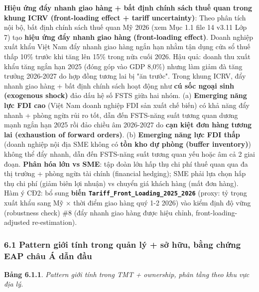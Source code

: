 \documentclass[12pt,a4paper]{article}
\begin{document}
\textbf{Hiệu ứng đẩy nhanh giao hàng + bất định chính sách thuế quan
trong khung ICRV (front-loading effect + tariff uncertainty)}: Theo phân
tích nội bộ, bất định chính sách thuế quan Mỹ 2026 (xem Mục 1.1 file 14
v3.11 Lớp 7) tạo \textbf{hiệu ứng đẩy nhanh giao hàng (front-loading
effect)}. Doanh nghiệp xuất khẩu Việt Nam đẩy nhanh giao hàng ngắn hạn
nhằm tận dụng cửa sổ thuế thấp 10\% trước khi tăng lên 15\% trong nửa
cuối 2026. Hậu quả: doanh thu xuất khẩu tăng ngắn hạn 2025 (đóng góp vào
GDP 8,0\%) nhưng làm giảm đà tăng trưởng 2026-2027 do hợp đồng tương lai
bị "ăn trước". Trong khung ICRV, đẩy nhanh giao hàng + bất định chính
sách hoạt động như \textbf{cú sốc ngoại sinh (exogenous shock)} đảo dấu
hệ số FSTS giữa hai nhóm. (a) \textbf{Emerging năng lực FDI cao} (Việt
Nam doanh nghiệp FDI sản xuất chế biến) có khả năng đẩy nhanh + phòng
ngừa rủi ro tốt, dẫn đến FSTS-năng suất tương quan dương mạnh ngắn hạn
2025 rồi đảo chiều âm 2026-2027 do \textbf{cạn kiệt đơn hàng tương lai
(exhaustion of forward orders)}. (b) \textbf{Emerging năng lực FDI thấp}
(doanh nghiệp nội địa SME không có \textbf{tồn kho dự phòng (buffer
inventory)}) không thể đẩy nhanh, dẫn đến FSTS-năng suất tương quan yếu
hoặc âm cả 2 giai đoạn. \textbf{Phân hóa lớn vs SME}: tập đoàn lớn hấp
thụ chi phí thuế quan qua đa thị trường + phòng ngừa tài chính
(financial hedging); SME phải lựa chọn hấp thụ chi phí (giảm biên lợi
nhuận) vs chuyển giá khách hàng (mất đơn hàng). Hàm ý CĐ2: bổ sung
\textbf{biến \texttt{Tariff\_Front\_Loading\_2025\_2026}} (proxy: tỷ
trọng xuất khẩu sang Mỹ × thời điểm giao hàng quý 1-2 2026) vào kiểm
định độ vững (robustness check) \#8 (đẩy nhanh giao hàng được hiệu
chỉnh, front-loading-adjusted re-estimation).

\hypertarget{61-pattern-giux1edbi-tuxednh-trong-quux1ea3n-luxfd--sux1edf-hux1eefu-bux1eb1ng-chux1ee9ng-eap-chuxe2u-uxe1-dux1eabn-ux111ux1ea7u}{%
\subsubsection{6.1 Pattern giới tính trong quản lý + sở hữu, bằng chứng
EAP châu Á dẫn
đầu}\label{61-pattern-giux1edbi-tuxednh-trong-quux1ea3n-luxfd--sux1edf-hux1eefu-bux1eb1ng-chux1ee9ng-eap-chuxe2u-uxe1-dux1eabn-ux111ux1ea7u}}

\textbf{Bảng 6.1.1}. \emph{Pattern giới tính trong TMT + ownership, phân
tầng theo khu vực địa lý.}
\end{document}
